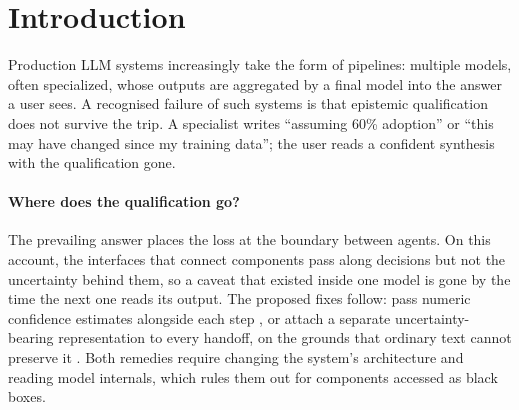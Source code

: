 \documentclass[11pt]{article}
\begin{document}
\begin{center}
\end{center}

\section{Introduction}
Production LLM systems increasingly take the form of pipelines: multiple
models, often specialized, whose outputs are aggregated by a final model into
the answer a user sees. A recognised failure of such systems is that epistemic
qualification does not survive the trip. A specialist writes ``assuming 60\%
adoption'' or ``this may have changed since my training data''; the user reads
a confident synthesis with the qualification gone.

\paragraph{Where does the qualification go?} The prevailing answer places the
loss at the boundary between agents. On this account, the interfaces that
connect components pass along decisions but not the uncertainty behind them,
so a caveat that existed inside one model is gone by the time the next one
reads its output. The proposed fixes follow: pass numeric confidence
estimates alongside each step \cite{uprop}, or attach a separate
uncertainty-bearing representation to every handoff, on the grounds that
ordinary text cannot preserve it \cite{laundering}. Both remedies require
changing the system's architecture and reading model internals, which rules
them out for components accessed as black boxes.
\end{document}

